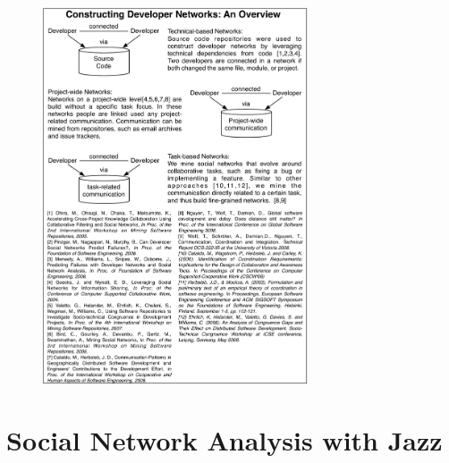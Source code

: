 \documentclass[12pt,oneside]{book}
\newcommand{\jazztm}{Jazz}
\begin{document}
\begin{figure}[t!]
\begin{center}
\includegraphics[width=0.7\textwidth]{figures/related_work.pdf}
\end{center}
\end{figure}





\section{Social Network Analysis with \jazztm}
\end{document}

